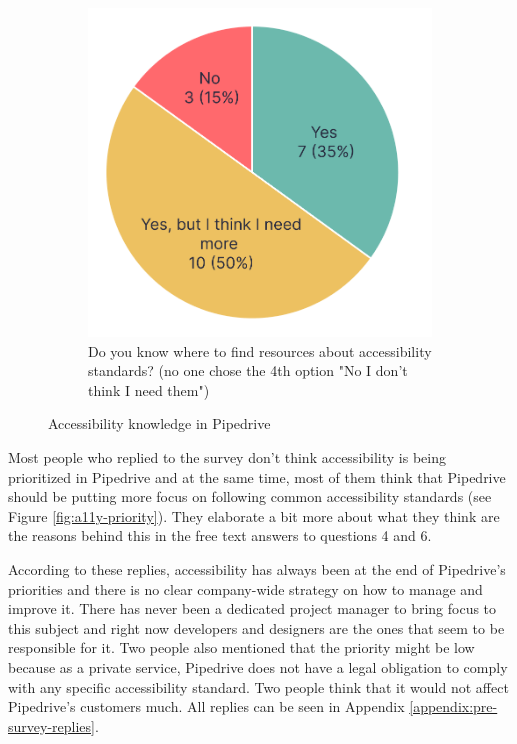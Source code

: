 \documentclass{master_thesis}
\begin{document}
\begin{figure}[H]
\begin{subfigure}{0.4\textwidth}
		\includegraphics[width=\textwidth]{img/a11y-resources.png}
		\caption{Do you know where to find resources
		about accessibility standards? (no one chose the 4th option "No I don't think I need them") }
    	\label{fig:a11y-resources}
	\end{subfigure}
	\caption{Accessibility knowledge in Pipedrive}
    \label{fig:a11y-knowledge}
\end{figure}

Most people who replied to the survey don't think accessibility is being prioritized in Pipedrive and at the same time, most of them think that Pipedrive should be putting more focus on following common accessibility standards (see Figure \ref{fig:a11y-priority}). They elaborate a bit more about what they think are the reasons behind this in the free text answers to questions 4 and 6.

According to these replies, accessibility has always been at the end of Pipedrive's priorities and there is no clear company-wide strategy on how to manage and improve it. There has never been a dedicated project manager to bring focus to this subject
and right now developers and designers are the ones that seem to be responsible for it. Two people also mentioned that the priority might be low because as a private service, Pipedrive does not have a legal obligation to comply with any specific accessibility standard. Two people think that it would not affect Pipedrive's customers much. All replies can be seen in  Appendix \ref{appendix:pre-survey-replies}.
\end{document}
